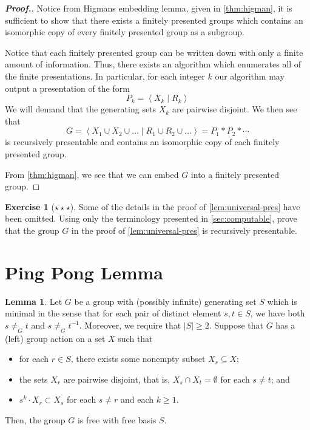 \documentclass[11pt,a4paper,reqno]{amsart}
\theoremstyle{plain}
\theoremstyle{definition}
\newtheorem{lemma}[theorem]{Lemma}
\theoremstyle{definition}
\newtheorem{exercise}[theorem]{Exercise}
\renewcommand\geq\geqslant
\newenvironment{myproof}{\begin{proof}[\normalfont\bfseries Proof.]}{\end{proof}}
\newcommand\exerciseLevelHard{$\star${\,}$\star${\,}$\star$}
\begin{document}
\begin{myproof}
	Notice from Higmans embedding lemma, given in \cref{thm:higman}, it is sufficient to show that there exists a finitely presented groups which contains an isomorphic copy of every finitely presented group as a subgroup.

	Notice that each finitely presented group can be written down with only a finite amount of information.
	Thus, there exists an algorithm which enumerates all of the finite presentations.
  In particular, for each integer $k$ our algorithm may output a presentation of the form
	\[
		P_k = \left\langle X_k\mid R_k  \right\rangle
	\]
	We will demand that the generating sets $X_k$ are pairwise disjoint.
	We then see that
	\[
		G = \left\langle
		X_1 \cup X_2 \cup \ldots
		\mid
		R_1 \cup R_2\cup\ldots
		\right\rangle = P_1 * P_2 * \cdots
	\]
	is recursively presentable and contains an isomorphic copy of each finitely presented group.

	From \cref{thm:higman}, we see that we can embed $G$ into a finitely presented group.
\end{myproof}

\begin{exercise}[\exerciseLevelHard]
  Some of the details in the proof of \cref{lem:universal-pres} have been omitted.
  Using only the terminology presented in \cref{sec:computable}, prove that the group $G$ in the proof of \cref{lem:universal-pres} is recursively presentable.
\end{exercise}

\section{Ping Pong Lemma}

\begin{lemma}\label{lem:ping-pong}
	Let $G$ be a group with (possibly infinite) generating set $S$ which is minimal in the sense that for each pair of distinct element $s,t\in S$, we have both $s\neq_G t$ and $s \neq_G t^{-1}$.
	Moreover, we require that $|S|\geq 2$.
	Suppose that $G$ has a (left) group action on a set $X$ such that
	\begin{itemize}
		\item for each $r \in S$, there exists some nonempty subset $X_r\subseteq X$;
		\item the sets $X_r$ are pairwise disjoint, that is, $X_s\cap X_t = \emptyset$ for each $s\neq t$; and
		\item $s^k \cdot X_r \subset X_s$ for each $s \neq r$ and each $k \geq 1$.
	\end{itemize}
	Then, the group $G$ is free with free basis $S$.
\end{lemma}
\end{document}
